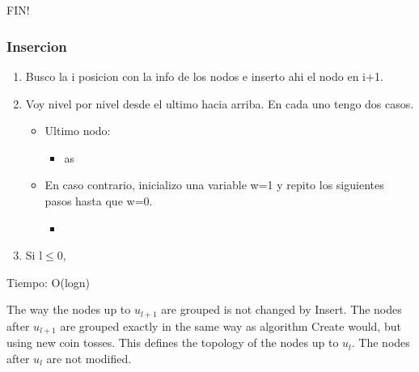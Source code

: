 \documentclass[10pt,handout]{beamer}
\begin{document}
\section{}
\begin{frame}
\frametitle{}


\end{frame}


\section{}
\begin{frame}
\frametitle{}

\huge
\centering
FIN!
\end{frame}



\begin{frame}
\frametitle{Insercion}
  \begin{enumerate}
    \item  Busco la i posicion con la info de los nodos e inserto
  ahi el nodo en i+1.
  \item Voy nivel por nivel desde el ultimo hacia arriba.
  En cada uno tengo dos casos.
  \begin{itemize}
    \item Ultimo nodo:
      \begin{itemize}
        \item as
      \end{itemize}
    \item En caso contrario, inicializo una variable w=1 y repito los siguientes pasos hasta que w=0.
      \begin{itemize}
        \item
      \end{itemize}
  \end{itemize}
\item Si l$\leq$0,
\end{enumerate}
  Tiempo: O(logn)

  The way the nodes up to $u_{l+1}$ are grouped is not changed by Insert.
  The nodes after $u_{l+1}$ are grouped exactly in the same way as algorithm Create would,
  but using new coin tosses.
  This defines the topology of the nodes up to $u_l$.
  The nodes after $u_l$ are not modified.

\end{frame}

\end{document}

